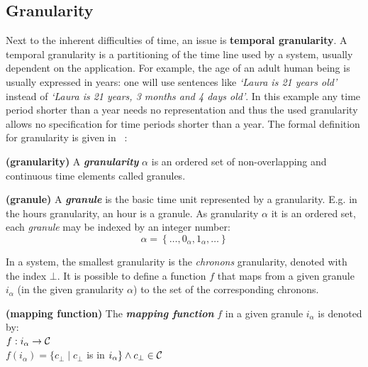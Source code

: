 \subsection{\label{subsec:granularity}Granularity}
Next to the inherent difficulties of time, an issue is \textbf{temporal granularity}. A temporal granularity is a partitioning of the time line used by a system, usually dependent on the application. For example, the age of an adult human being is usually expressed in years: one will use sentences like \emph{`Laura is 21 years old'} instead of \emph{`Laura is 21 years, 3 months and 4 days old'}. In this example any time period shorter than a year needs no representation and thus the used granularity allows no specification for time periods shorter than a year.
The formal definition for granularity is given in ~\cite{Lin97}:


\begin{definition}
\label{def:granularity}\textbf{(granularity)}
A \textbf{\emph{granularity}} $\alpha$ is an ordered set of non-overlapping and continuous time elements called granules. \\
\end{definition}

\begin{definition}
\label{def:granule}\textbf{(granule)}
A \textbf{\emph{granule}} is the basic time unit represented by a granularity. E.g. in the hours granularity, an hour is a granule.
As granularity $\alpha$ it is an ordered set, each \emph{granule} may be indexed by an integer number:\\
\begin{equation}
\alpha = \left \lbrace \ldots, 0_\alpha, 1_\alpha, \ldots \right \rbrace
\end{equation}
\end{definition}

In a system, the smallest granularity is the \emph{chronons} granularity, denoted with the index $\bot$. It is possible to define a function $f$ that maps from  a given granule $i_\alpha$ (in the given granularity $\alpha$) to the set of the corresponding chronons. 

\begin{definition}
\label{def:mapping-function}
\textbf{(mapping function)}
The \textbf{\emph{mapping function}} $f$ in a given granule $i_\alpha$ is denoted by:\\
$f:i_\alpha \rightarrow \mathcal{C}$\\
$f(i_\alpha) = \lbrace c_\bot \mid c_\bot$ is in $i_\alpha \rbrace \wedge c_\bot \in \mathcal{C}$\\
\end{definition}



